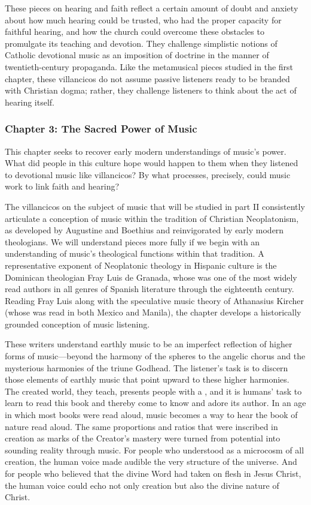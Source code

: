 \documentclass{vcbook-proposal}
\begin{document}
These pieces on hearing and faith reflect a certain amount of doubt and anxiety about how much hearing could be trusted, who had the proper capacity for faithful hearing, and how the church could overcome these obstacles to promulgate its teaching and devotion.
They challenge simplistic notions of Catholic devotional music as an imposition of doctrine in the manner of twentieth-century propaganda. 
Like the metamusical pieces studied in the first chapter, these villancicos do not assume passive listeners ready to be branded with Christian dogma; rather, they challenge listeners to think about the act of hearing itself.


\subsubsection{Chapter 3: The Sacred Power of Music}

This chapter seeks to recover early modern understandings of music's power.
What did people in this culture hope would happen to them when they listened to devotional music like villancicos?
By what processes, precisely, could music work to link faith and hearing?

The villancicos on the subject of music that will be studied in part II consistently articulate a conception of music within the tradition of Christian Neoplatonism, as developed by Augustine and Boethius and reinvigorated by early modern theologians.
We will understand pieces more fully if we begin with an understanding of music's theological functions within that tradition.
A representative exponent of Neoplatonic theology in Hispanic culture is the Dominican theologian Fray Luis de Granada, whose was one of the most widely read authors in all genres of Spanish literature through the eighteenth century.
Reading Fray Luis along with the speculative music theory of Athanasius Kircher (whose  was read in both Mexico and Manila), the chapter develops a historically grounded conception of music listening.

These writers understand earthly music to be an imperfect reflection of higher forms of music---beyond the harmony of the spheres to the angelic chorus and the mysterious harmonies of the triune Godhead. 
The listener's task is to discern those elements of earthly music that point upward to these higher harmonies.
The created world, they teach, presents people with a , and it is humans' task to learn to read this book and thereby come to know and adore its author.
In an age in which most books were read aloud, music becomes a way to hear the book of nature read aloud.
The same proportions and ratios that were inscribed in creation as marks of the Creator's mastery were turned from potential into sounding reality through music. 
For people who understood  as a microcosm of all creation, the human voice made audible the very structure of the universe.
And for people who believed that the divine Word had taken on flesh in Jesus Christ, the human voice could echo not only creation but also the divine nature of Christ.
\end{document}

